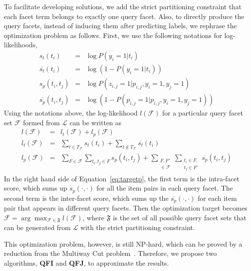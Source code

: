 To facilitate developing solutions, we add the strict partitioning constraint that each facet term belongs to exactly one query facet. Also, to directly produce the query facets, instead of inducing them after predicting labels, we rephrase the optimization problem as follows. First, we use the following notations for log-likelihoods,
\begin{eqnarray*}
 s_t(t_i) &=& \log P(y_i=1|t_i)      \nonumber \\
  \overline{s_t}(t_i)&=&\log \left( 1-P(y_i=1|t_i) \right) \nonumber \\
 s_p(t_i, t_j)&=&\log P(z_{i,j}=1|p_{i,j},y_i=1,y_j=1) \nonumber \\
  \overline{s_p}(t_i, t_j)&=&\log\left(1-P(p_{i,j}=1|p_{i,j},y_i=1,y_j=1)\right) \nonumber
\end{eqnarray*}
Using the notations above, the log-likelihood $l(\mathcal{F})$ for a particular query facet set $\mathcal{F}$ formed from $\mathcal{L}$ can be written as 
\begin{eqnarray}
\label{eq:target}
l(\mathcal{F}) &=&l_t(\mathcal{F}) + l_p(\mathcal{F}) \nonumber\\
l_t(\mathcal{F}) &=& \sum_{t\in T_\mathcal{F}}{s_t(t_i)}+\sum_{t\not\in T_\mathcal{F}}{\overline{s_t}(t_i)} \nonumber \\
l_p(\mathcal{F}) &=&\sum_{F \in \mathcal{F}}{\sum_{t_i,t_j \in F}{s_p(t_i,t_j)}} 
+ \sum_{\substack{F, F' \\ \in \mathcal{F}}}{\sum_{\substack{t_i \in F, \\ t_j \in F'}}{\overline{s_p}(t_i,t_j)}}
\label{eq:targetp}
\end{eqnarray}
In the right hand side of Equation~\ref{eq:targetp}, the first term  is the intra-facet score, which sums up $s_p(\cdot, \cdot)$ for all the item pairs in each query facet. The second term is the inter-facet score, which sums up the $\overline{s_p}(\cdot,\cdot)$ for each item pair that appears in different query facets. Then the optimization target becomes $\mathcal{F}=\arg\max_{\mathcal{F}\in\mathfrak{F}}{l(\mathcal{F})}$, where $\mathfrak{F}$ is the set of all possible query facet sets that can be generated from $\mathcal{L}$ with the strict partitioning constraint.

This optimization problem, however, is still NP-hard, which can be proved by a reduction from the Multiway Cut problem~\cite{bansal2002correlation}.
Therefore, we propose two algorithms, \textbf{QFI} and \textbf{QFJ}, to approximate the results.

